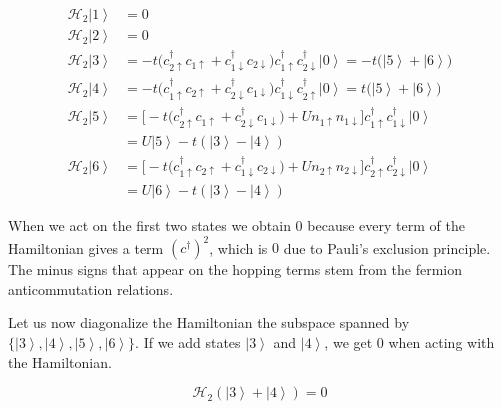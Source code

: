 \documentclass[10pt, twocolumn, twoside]{article}
\begin{document}
\begin{equation}
\begin{split}
\mathcal{H}_{2}\left| 1 \right\rangle & = 0 \\
\mathcal{H}_{2}\left| 2 \right\rangle & = 0 \\
\mathcal{H}_{2}\left| 3 \right\rangle & =-t \big(c_{2\uparrow}^\dagger c_{1\uparrow} + c_{1\downarrow}^\dagger c_{2\downarrow} \big)c_{1\uparrow}^\dagger  c_{2\downarrow}^\dagger \left| 0 \right\rangle = -t \big( \left| 5 \right\rangle + \left| 6 \right\rangle \big)  \\
\mathcal{H}_{2}\left| 4 \right\rangle &=-t \big(c_{1\uparrow}^\dagger c_{2\uparrow} + c_{2\downarrow}^\dagger c_{1\downarrow} \big)c_{1\downarrow}^\dagger c_{2\uparrow}^\dagger \left| 0 \right\rangle = t \big( \left| 5 \right\rangle + \left| 6 \right\rangle \big) \\
\mathcal{H}_{2}\left| 5 \right\rangle & =\bigg[ -t \big(c_{2\uparrow}^\dagger c_{1\uparrow} + c_{2\downarrow}^\dagger c_{1\downarrow} \big) + U n_{1\uparrow}n_{1\downarrow}  \bigg]c_{1\uparrow}^\dagger c_{1\downarrow}^\dagger \left| 0 \right\rangle \\
&= U \left| 5 \right\rangle - t ( \left| 3 \right\rangle - \left| 4 \right\rangle )  \\
\mathcal{H}_{2}\left| 6 \right\rangle & = \bigg[ -t \big(c_{1\uparrow}^\dagger c_{2\uparrow} + c_{1\downarrow}^\dagger c_{2\downarrow} \big) + U n_{2\uparrow}n_{2\downarrow}  \bigg]c_{2\uparrow}^\dagger c_{2\downarrow}^\dagger \left| 0 \right\rangle \\
&= U \left| 6 \right\rangle - t ( \left| 3 \right\rangle - \left| 4 \right\rangle ) 
\end{split}
\end{equation}

When we act on the first two states we obtain $0$ because every term of the Hamiltonian gives a term $(c^\dagger)^2$, which is $0$ due to Pauli's exclusion principle. The minus signs that appear on the hopping terms stem from the fermion anticommutation relations.

Let us now diagonalize the Hamiltonian the subspace spanned by $\{\left| 3 \right\rangle, \left| 4 \right\rangle, \left| 5 \right\rangle, \left| 6 \right\rangle \}$. If we add states $\left| 3 \right\rangle$ and $\left| 4 \right\rangle $, we get $0$ when acting with the Hamiltonian. 

\begin{equation}
\mathcal{H}_{2} ( \left| 3 \right\rangle + \left| 4 \right\rangle ) = 0
\end{equation}
\end{document}
